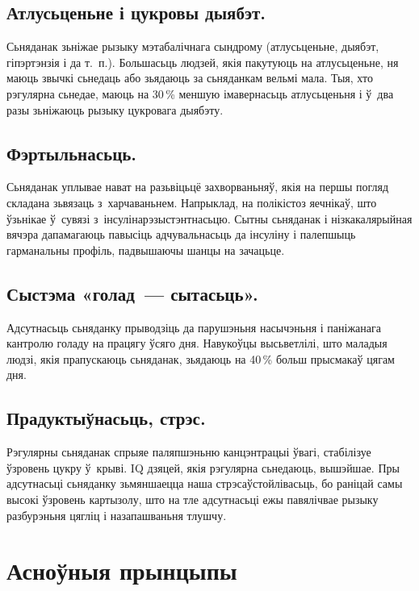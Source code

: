\subsection{Атлусьценьне і цукровы дыябэт.}
Сьняданак зьніжае рызыку мэтабалічнага сындрому (атлусьценьне, дыябэт, гіпэртэнзія і да т.~п.). Большасьць людзей, якія пакутуюць на атлусьценьне, ня маюць звычкі сьнедаць або зьядаюць за сьняданкам вельмі мала. Тыя, хто рэгулярна сьнедае, маюць на 30\,\% меншую імавернасьць атлусьценьня і ў~два разы зьніжаюць рызыку цукровага дыябэту.

\subsection{Фэртыльнасьць.}
Сьняданак уплывае нават на разьвіцьцё захворваньняў, якія на першы погляд складана зьвязаць з~харчаваньнем. Напрыклад, на полікістоз яечнікаў, што ўзьнікае ў~сувязі з~інсулінарэзыстэнтнасьцю. Сытны сьняданак і нізкакалярыйная вячэра дапамагаюць павысіць адчувальнасьць да інсуліну і палепшыць гарманальны профіль, падвышаючы шанцы на зачацьце.

\subsection{Сыстэма «голад~--- сытасьць».}
Адсутнасьць сьняданку прыводзіць да парушэньня насычэньня і паніжанага кантролю голаду на працягу ўсяго дня. Навукоўцы высьветлілі, што маладыя людзі, якія прапускаюць сьняданак, зьядаюць на 40\,\% больш прысмакаў цягам дня.


\subsection{Прадуктыўнасьць, стрэс.}
Рэгулярны сьняданак спрыяе паляпшэньню канцэнтрацыі ўвагі, стабілізуе ўзровень цукру ў~крыві. IQ дзяцей, якія рэгулярна сьнедаюць, вышэйшае. Пры адсутнасьці сьняданку зьмяншаецца наша стрэсаўстойлівасьць, бо раніцай самы высокі ўзровень картызолу, што на тле адсутнасьці ежы павялічвае рызыку разбурэньня цягліц і назапашваньня тлушчу.

\section{Асноўныя прынцыпы}


